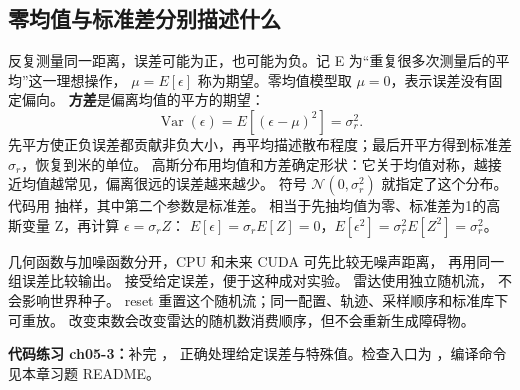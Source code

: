 \subsection*{零均值与标准差分别描述什么}
反复测量同一距离，误差可能为正，也可能为负。记 E 为“重复很多次测量后的平均”这一理想操作，
$\mu=E[\epsilon]$ 称为期望。零均值模型取 $\mu=0$，表示误差没有固定偏向。
\textbf{方差}是偏离均值的平方的期望：
\begin{equation}
\operatorname{Var}(\epsilon)=E[(\epsilon-\mu)^2]=\sigma_r^2.
\end{equation}
先平方使正负误差都贡献非负大小，再平均描述散布程度；最后开平方得到标准差 $\sigma_r$，恢复到米的单位。
高斯分布用均值和方差确定形状：它关于均值对称，越接近均值越常见，偏离很远的误差越来越少。
符号 $\mathcal N(0,\sigma_r^2)$ 就指定了这个分布。代码用
 抽样，其中第二个参数是标准差。
相当于先抽均值为零、标准差为1的高斯变量 Z，再计算 $\epsilon=\sigma_r Z$：
$E[\epsilon]=\sigma_r E[Z]=0$，$E[\epsilon^2]=\sigma_r^2E[Z^2]=\sigma_r^2$。

\par\noindent\begin{minipage}{\linewidth}

\end{minipage}\par

几何函数与加噪函数分开，CPU 和未来 CUDA 可先比较无噪声距离，
再用同一组误差比较输出。 接受给定误差，便于这种成对实验。
雷达使用独立随机流， 不会影响世界种子。
reset 重置这个随机流；同一配置、轨迹、采样顺序和标准库下可重放。
改变束数会改变雷达的随机数消费顺序，但不会重新生成障碍物。

\textbf{代码练习 ch05-3：}补完 ，
正确处理给定误差与特殊值。检查入口为 ，编译命令见本章习题 README。

